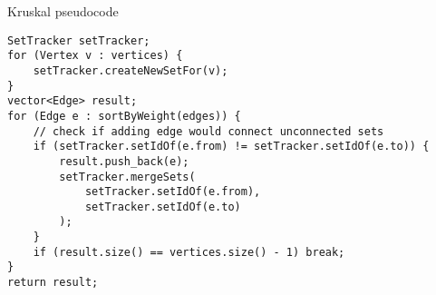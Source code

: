 \begin{frame}[fragile,label=kruskalCode]{Kruskal pseudocode}
\lstset{language=C++,style=smaller}
\begin{lstlisting}
SetTracker setTracker;
for (Vertex v : vertices) {
    setTracker.createNewSetFor(v);
}
vector<Edge> result;
for (Edge e : sortByWeight(edges)) {
    // check if adding edge would connect unconnected sets
    if (setTracker.setIdOf(e.from) != setTracker.setIdOf(e.to)) {
        result.push_back(e);
        setTracker.mergeSets(
            setTracker.setIdOf(e.from),
            setTracker.setIdOf(e.to)
        );
    }
    if (result.size() == vertices.size() - 1) break;
}
return result;
\end{lstlisting}
\end{frame}
